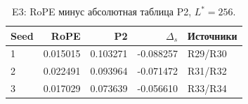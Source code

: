 \begin{table}[H]\centering\small
\setlength{\tabcolsep}{4pt}
\caption{E3: RoPE минус абсолютная таблица P2, $L^*=256$.}\label{tab:e3}
\begin{tabular}{lrrrl}
\toprule
Seed & RoPE & P2 & $\Delta_s$ & Источники \\
\midrule
1 & 0.015015 & 0.103271 & -0.088257 & R29/R30 \\
2 & 0.022491 & 0.093964 & -0.071472 & R31/R32 \\
3 & 0.017029 & 0.073639 & -0.056610 & R33/R34 \\
\bottomrule
\end{tabular}
\end{table}
